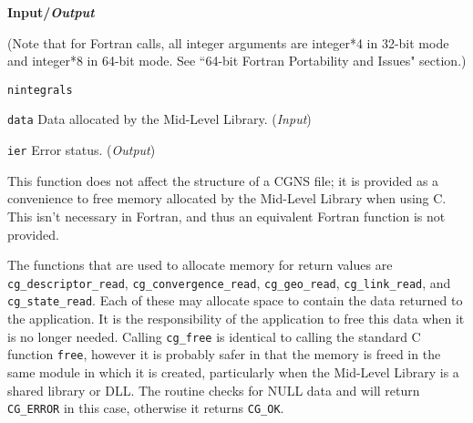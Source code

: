 \noindent
\textbf{\textcolor{input}{Input}/\textcolor{output}{\textit{Output}}}

\noindent (Note that for Fortran calls, all integer arguments are integer*4 in 32-bit mode and integer*8 in 64-bit mode.
See ``64-bit Fortran Portability and Issues" section.)
\begin{Ventryi}{\texttt{nintegrals}}\raggedright
\item [\texttt{data}]
      Data allocated by the Mid-Level Library.
      (\textcolor{input}{\textit{Input}})
\item [\texttt{ier}]
      Error status.
      (\textcolor{output}{\textit{Output}})
\end{Ventryi}

This function does not affect the structure of a CGNS file; it is
provided as a convenience to free memory allocated by the Mid-Level
Library when using C.
This isn't necessary in Fortran, and thus an equivalent Fortran function
is not provided.

The functions that are used to allocate memory for return values are
\texttt{cg\_descriptor\_read}, \texttt{cg\_convergence\_read},
\texttt{cg\_geo\_read}, \texttt{cg\_link\_read}, and
\texttt{cg\_state\_read}.
Each of these may allocate space to contain the data returned
to the application.
It is the responsibility of the application to free this data when it is
no longer needed.
Calling \texttt{cg\_free} is identical to calling the standard C function
\texttt{free}, however it is probably safer in that the memory is
freed in the same module in which it is created, particularly when the
Mid-Level Library is a shared library or DLL.
The routine checks for NULL data and will return \texttt{CG\_ERROR} in
this case, otherwise it returns \texttt{CG\_OK}.
